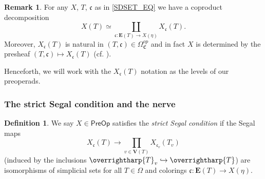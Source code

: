 \documentclass[a4paper,10pt
,draft
]{article}%
\numberwithin{equation}{section}
\numberwithin{figure}{section}
\newtheorem{proposition}[equation]{Proposition}%
\theoremstyle{definition} %
\newtheorem{definition}[equation]{Definition}%
\newtheorem{remark}[equation]{Remark}%
\newcommand{\vect}[1]{\text{\overrightharp{\ensuremath{#1}}}}
\newcommand{\sSet}{\ensuremath{\mathsf{sSet}}}%
\newcommand{\PreOp}{\mathsf{PreOp}}
\newcommand{\Fun}{\mathsf{Fun}}
\newcommand{\1}{\ensuremath{\mathbbm 1}}%
\begin{document}
\begin{remark}
        For any $X$, $T$, $\mathfrak c$ as in \eqref{SDSET_EQ} %
        we have a coproduct decomposition \cite[ \eqref{TAS-COLDEC_EQ}]{BP_TAS}
        \begin{equation}
                \label{COLDEC_EQ}
                X(T) \simeq \coprod_{\mathfrak c \colon \boldsymbol{E}(T) \to X(\eta)} X_{\mathfrak c}(T).
        \end{equation}
        Moreover, $X_{\mathfrak c}(T)$ is natural in $(T, \mathfrak c) \in \Omega_{\mathfrak C}^{op}$
        and in fact
        $X$ is determined by the presheaf $(T, \mathfrak c) \mapsto X_{\mathfrak c}(T)$
        (cf. \cite[ \eqref{TAS-PREOPCOLFIXEQ EQ}]{BP_TAS}).
        
        Henceforth, we will work with the $X_{\mathfrak c}(T)$ notation as the levels of our preoperads.
\end{remark}

\subsubsection*{The strict Segal condition and the nerve}


\begin{definition}
        \label{SSC_DEF}
        We say $X \in \PreOp$ satisfies the \textit{strict Segal condition} if
        the Segal maps
        \[
                X_{\mathfrak c}(T) \to \prod_{v \in \boldsymbol{V}(T)} X_{\mathfrak c_v}(T_v)
        \]
        (induced by the inclusions $\vect T_v \hookrightarrow \vect T$)
        are isomorphisms of simplicial sets
        for all $T \in \Omega$ and colorings $\mathfrak c \colon \boldsymbol{E}(T) \to X(\eta)$.
\end{definition}
\end{document}
